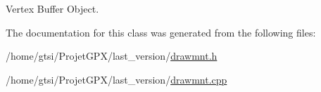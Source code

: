 Vertex Buffer Object. 



The documentation for this class was generated from the following files\+:\begin{DoxyCompactItemize}
\item 
/home/gtsi/\+Projet\+G\+P\+X/last\+\_\+version/\hyperlink{drawmnt_8h}{drawmnt.\+h}\item 
/home/gtsi/\+Projet\+G\+P\+X/last\+\_\+version/\hyperlink{drawmnt_8cpp}{drawmnt.\+cpp}\end{DoxyCompactItemize}
